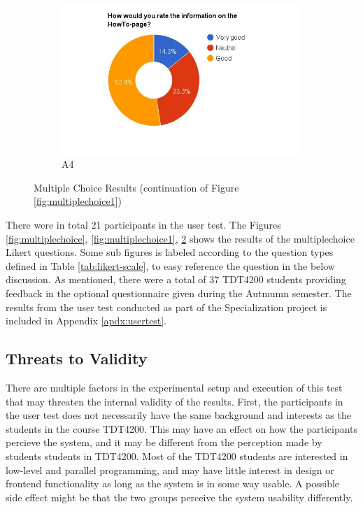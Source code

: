 \begin{figure}
    \begin{subfigure}[h]{0.45\textwidth}
        \centerline{\includegraphics[width=1.5\textwidth]{results/howto_cmb.jpg}}
        \caption{A4}
        \label{fig:cmb-howto}
    \end{subfigure}
    \caption{Multiple Choice Results (continuation of Figure \ref{fig:multiplechoice1})}
    \label{fig:multiplechoice2}
\end{figure}

There were in total 21 participants in the user test. The Figures \ref{fig:multiplechoice}, \ref{fig:multiplechoice1}, \ref{fig:multiplechoice2} shows the results of the multiplechoice Likert questions. Some sub figures is labeled according to the question types defined in Table \ref{tab:likert-scale}, to easy reference the question in the below discussion. As mentioned, there were a total of 37 TDT4200 students providing feedback in the optional questionnaire given during the Autmumn semester. The results from the user test conducted as part of the Specialization project is included in Appendix \ref{apdx:usertest}.

\subsection{Threats to Validity}
There are multiple factors in the experimental setup and execution of this test that may threaten the internal validity of the results. First, the participants in the user test does not necessarily have the same background and interests as the students in the course TDT4200. This may have an effect on how the participants percieve the system, and it may be different from the perception made by students students in TDT4200. Most of the TDT4200 students are interested in low-level and parallel programming, and may have little interest in design or frontend functionality as long as the system is in some way usable. A possible side effect might be that the two groups perceive the system usability differently. \\

